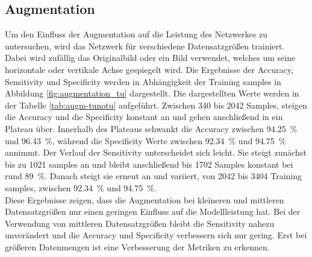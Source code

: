 \subsection{Augmentation}
Um den Einfluss der Augmentation auf die Leistung des Netzwerkes zu untersuchen, wird das Netzwerk für verschiedene Datensatzgrößen trainiert.
Dabei wird zufällig das Originalbild oder ein Bild verwendet, welches um seine horizontale oder vertikale Achse gespiegelt wird. 
Die Ergebnisse der Accuracy, Sensitivity und Specificity werden in Abhängigkeit der Training samples in Abbildung \ref{fig:augmentation_tu} dargestellt.
Die dargestellten Werte werden in der Tabelle \ref{tab:augm-tunotu} aufgeführt.
Zwischen 340 bis 2042 Samples, steigen die Accuracy und die Specificity konstant an und gehen anschließend in ein Plateau über.
Innerhalb des Plateaus schwankt die Accuracy zwischen \SI{94.25}{\percent} und \SI{96.43}{\percent}, während die Specificity Werte zwischen \SI{92.34}{\percent} und \SI{94.75}{\percent} annimmt.
Der Verlauf der Sensitivity unterscheidet sich leicht.
Sie steigt zunächst bis zu 1021 samples an und bleibt anschließend bis 1702 Samples konstant bei rund \SI{89}{\%}.
Danach steigt sie erneut an und variiert, von 2042 bis 3404 Training samples, zwischen \SI{92.34}{\%} und \SI{94.75}{\%}.\\
Diese Ergebnisse zeigen, dass die Augmentation bei kleineren und mittleren Datensatzgrößen nur einen geringen Einfluss auf die Modellleistung hat.
Bei der Verwendung von mittleren Datensatzgrößen bleibt die Sensitivity nahezu unverändert und die Accuracy und Specificity verbessern sich nur gering.
Erst bei größeren Datenmengen ist eine Verbesserung der Metriken zu erkennen. 
